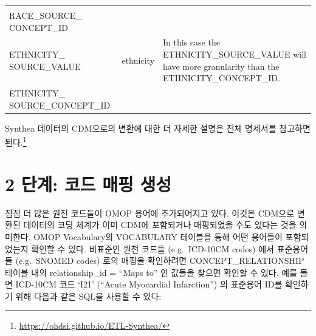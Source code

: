 \documentclass[11pt]{book}
\let\rmarkdownfootnote\footnote%
\def\footnote{\protect\rmarkdownfootnote}
\theoremstyle{definition}
\theoremstyle{definition}
\theoremstyle{definition}
\theoremstyle{remark}
\begin{document}
\begin{longtable}[]{@{}lll@{}}
\begin{minipage}[t]{0.50\columnwidth}
\strut
\end{minipage}\tabularnewline
\begin{minipage}[t]{0.28\columnwidth}\raggedright\strut
RACE\_SOURCE\_ CONCEPT\_ID\strut
\end{minipage} & \begin{minipage}[t]{0.13\columnwidth}\raggedright\strut
\strut
\end{minipage} & \begin{minipage}[t]{0.50\columnwidth}\raggedright\strut
\strut
\end{minipage}\tabularnewline
\begin{minipage}[t]{0.28\columnwidth}\raggedright\strut
ETHNICITY\_ SOURCE\_VALUE\strut
\end{minipage} & \begin{minipage}[t]{0.13\columnwidth}\raggedright\strut
ethnicity\strut
\end{minipage} & \begin{minipage}[t]{0.50\columnwidth}\raggedright\strut
In this case the ETHNICITY\_SOURCE\_VALUE will have more granularity
than the ETHNICITY\_CONCEPT\_ID.\strut
\end{minipage}\tabularnewline
\begin{minipage}[t]{0.28\columnwidth}\raggedright\strut
ETHNICITY\_ SOURCE\_CONCEPT\_ID\strut
\end{minipage} & \begin{minipage}[t]{0.13\columnwidth}\raggedright\strut
\strut
\end{minipage} & \begin{minipage}[t]{0.50\columnwidth}\raggedright\strut
\strut
\end{minipage}\tabularnewline
\bottomrule
\end{longtable}

Synthea 데이터의 CDM으로의 변환에 대한 더 자세한 설명은 전체 명세서를
참고하면 된다.\footnote{\url{https://ohdsi.github.io/ETL-Synthea/}}

\section{2 단계: 코드 매핑 생성}\label{---}

점점 더 많은 원천 코드들이 OMOP 용어에 추가되어지고 있다. 이것은 CDM으로
변환된 데이터의 코딩 체계가 이미 CDM에 포함되거나 매핑되었을 수도 있다는
것을 의미한다. OMOP Vocabulary의 VOCABULARY 테이블을 통해 어떤 용어들이
포함되었는지 확인할 수 있다. 비표준인 원천 코드들 (e.g.~ICD-10CM codes)
에서 표준용어들 (e.g.~SNOMED codes) 로의 매핑을 확인하려면
CONCEPT\_RELATIONSHIP 테이블 내의 relationship\_id = ``Maps to'' 인
값들을 찾으면 확인할 수 있다. 예를 들면 ICD-10CM 코드 `I21' (``Acute
Myocardial Infarction'') 의 표준용어 ID를 확인하기 위해 다음과 같은
SQL을 사용할 수 있다:
\end{document}
